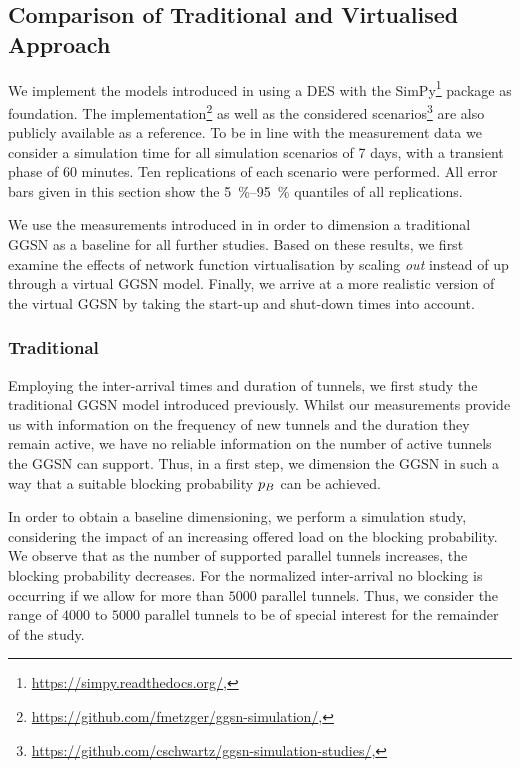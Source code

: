 \subsection{Comparison of Traditional and Virtualised Approach}\label{sec:cloud:virtualized_network_functions:performance_evaluation}

We implement the models introduced in  using a \gls{DES} with the SimPy\footnote{\url{https://simpy.readthedocs.org/}, \accessed} package as foundation.
The implementation\footnote{\url{https://github.com/fmetzger/ggsn-simulation/}, \accessed} as well as the considered scenarios\footnote{\url{https://github.com/cschwartz/ggsn-simulation-studies/}, \accessed} are also publicly available as a reference.
To be in line with the measurement data we consider a simulation time for all simulation scenarios of 7 days, with a transient phase of 60 minutes.
Ten replications of each scenario were performed.
All error bars given in this section show the \SIrange{5}{95}{\percent} quantiles of all replications.

We use the measurements introduced in  in order to dimension a traditional \gls{GGSN} as a baseline for all further studies.
Based on these results, we first examine the effects of network function virtualisation by scaling \emph{out} instead of up through a virtual \gls{GGSN} model.
Finally, we arrive at a more realistic version of the virtual \gls{GGSN} by taking the start-up and shut-down times into account.

\subsubsection*{Traditional }\label{sec:cloud:virtualized_network_functions:performance_evaluation:traditional_ggsn}

Employing the inter-arrival times and duration of tunnels, we first study the traditional \gls{GGSN} model introduced previously.
Whilst our measurements provide us with information on the frequency of new tunnels and the duration they remain active, we have no reliable information on the number of active tunnels the \gls{GGSN} can support.
Thus, in a first step, we dimension the \gls{GGSN} in such a way that a suitable blocking probability \(p_B\) can be achieved.

In order to obtain a baseline dimensioning, we perform a simulation study, considering the impact of an increasing offered load on the blocking probability.
We observe that as the number of supported parallel tunnels increases, the blocking probability decreases.
For the normalized inter-arrival no blocking is occurring if we allow for more than \(5000\) parallel tunnels.
Thus, we consider the range of \(4000\) to \(5000\) parallel tunnels to be of special interest for the remainder of the study.

